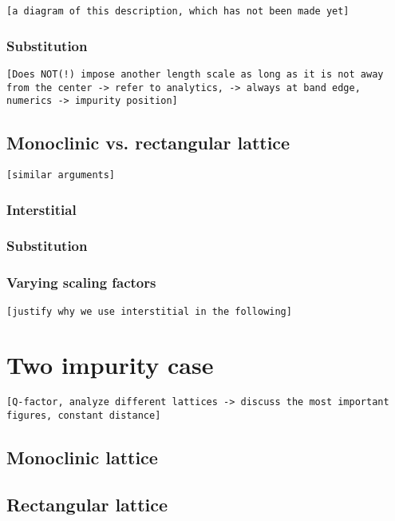 \documentclass[aps,pra,superscriptaddress,twocolumn]{revtex4-1}
\newcommand{\commentSB}[1]{\texttt{\color{blue}[#1]}}
\newcommand{\commentSO}[1]{\texttt{\color{orange}[#1]}}
\begin{document}
\commentSB{a diagram of this description, which has not been made yet}


\subsubsection{Substitution}
\commentSO{Does NOT(!) impose another length scale as long as it is not away from the center -> refer to analytics, -> always at band edge, numerics -> impurity position}

\subsection{Monoclinic vs. rectangular lattice}
\commentSO{similar arguments}

\subsubsection{Interstitial}


\subsubsection{Substitution}

\subsubsection{Varying scaling factors}
\commentSO{justify why we use interstitial in the following}

\section{Two impurity case}
\commentSO{Q-factor, analyze different lattices -> discuss the most important figures, constant distance}

\subsection{Monoclinic lattice}


\subsection{Rectangular lattice}
\end{document}
